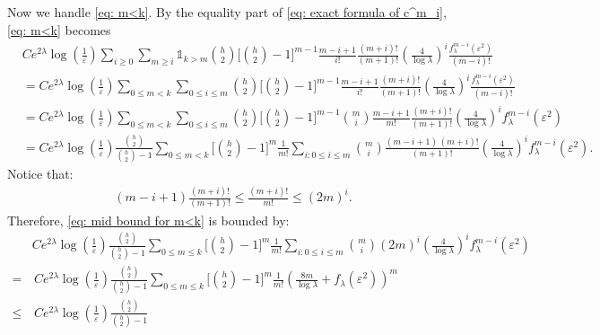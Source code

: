 \documentclass[a4paper,reqno,11pt]{amsart}
\makeatletter
\renewenvironment{proof}[1][\proofname]{\par
\pushQED{\qed}%
\normalfont \topsep4\p@\@plus4\p@\relax
\trivlist
\item[\hskip\labelsep
\bfseries
#1\@addpunct{.}]\ignorespaces
}{%
\popQED\endtrivlist\@endpefalse
}
\numberwithin{equation}{section}
\theoremstyle{mytheorem}
\newcommand{\gl}{\lambda}
\newcommand{\ind}{\mathds{1}}
\renewcommand{\epsilon}{\varepsilon}
\newcommand\qa{\bigg[}
\newcommand\qb{\bigg]}
\newcommand\ra{\left(}
\newcommand\rb{\right)}
\newcommand{\f}{\frac}
\makeatother
\begin{document}
{\begin{proof}[Proof of Proposition \ref{thm: g upper bound}]
Now we handle \eqref{eq: m<k}. By the equality part of \eqref{eq: exact formula of c^m_i}, \eqref{eq: m<k} becomes
\begin{equation}\label{eq: mid bound for m<k}
\begin{split}
    & C e^{2\gl}
    \log \ra \f{1}{\epsilon} \rb
    \sum_{i\ge 0}
    \sum_{m\ge i}
    \ind_{k>m}
        {h\choose 2}
    \qa
    {h\choose 2}-1      
    \qb^{m-1} 
    \f{m-i+1}{i!}\frac{(m+i)!}{(m+1)!}
    \ra \f{4}{\log\gl} \rb^i
    \frac{f^{m-i}_\gl(\epsilon^2)}{(m-i)!}\\
    & = C e^{2\gl}
    \log \ra \f{1}{\epsilon} \rb
    \sum_{0\le m < k}
    \sum_{0\le i\le m}
    {h\choose 2}
    \qa
    {h\choose 2}-1      
    \qb^{m-1} 
    \f{m-i+1}{i!}\frac{(m+i)!}{(m+1)!}
    \ra \f{4}{\log\gl} \rb^i
    \frac{f^{m-i}_\gl(\epsilon^2)}{(m-i)!}\\
    & = C e^{2\gl}
    \log \ra \f{1}{\epsilon} \rb
    \sum_{0\le m < k}
    \sum_{0\le i\le m}
    {h\choose 2}
    \qa
    {h\choose 2}-1      
    \qb^{m-1} 
    {m\choose i}
     \frac{m-i+1}{m!} \frac{(m+i)!}{(m+1)!}
    \ra \f{4}{\log\gl} \rb^i
    f^{m-i}_\gl(\epsilon^2)\\
    & =
    C e^{2\gl}
    \log \ra \f{1}{\epsilon} \rb \f{{h\choose 2}}{{h\choose 2}-1}
    \sum_{0\le m < k}
    \qa {h\choose 2}-1 \qb^m 
    \frac{1}{m!}
    \sum_{i: 0\le i\le m}
    {m\choose i}
    \frac{ (m-i+1) \, (m+i)!}{(m+1)!}
    \ra \f{4}{\log\gl} \rb^i
    f^{m-i}_\gl(\epsilon^2).
    \end{split}
    \end{equation}
    Notice that:
    \begin{align*}
    (m-i+1)\frac{(m+i)!}{(m+1)!}
    \le 
    \frac{(m+i)!}{m!}\le (2m)^i.
    \end{align*}
    Therefore, \eqref{eq: mid bound for m<k} is bounded by:
    \begin{align}
    & 
    C e^{2\gl}
    \log \ra \f{1}{\epsilon} \rb \f{{h\choose 2}}{{h\choose 2}-1}
    \sum_{0\le m\le k}
    \qa {h\choose 2}-1 \qb^m 
    \frac{1}{m!}
    \sum_{i: 0\le i\le m}
    {m\choose i}
    (2m)^i
    \ra \f{4}{\log\gl} \rb^i
    f^{m-i}_\gl(\epsilon^2)\\
    =&  \,C e^{2\gl} \label{eq: binomial}
    \log \ra \f{1}{\epsilon} \rb \f{{h\choose 2}}{{h\choose 2}-1}
    \sum_{0\le m\le k}
    \qa {h\choose 2}-1 \qb^m 
    \frac{1}{m!}
    \ra \f{8m}{\log\gl} + f_\gl(\epsilon^2) \rb^m\\
    \le &  \, C e^{2\gl}
    \log \ra \f{1}{\epsilon} \rb \f{{h\choose 2}}{{h\choose 2}-1}

\end{align}
\end{proof}}
\end{document}
